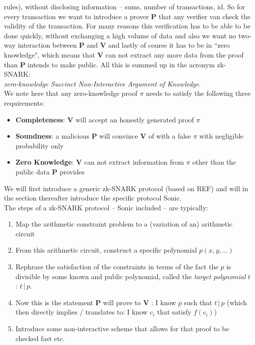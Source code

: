 \documentclass[11pt,oneside]{article}
\newcommand{\bP}{\textbf{P} }
\newcommand{\bV}{\textbf{V} }
\theoremstyle{definition}
\theoremstyle{remark}
\numberwithin{equation}{section}
\begin{document}
rules), without disclosing information -- sums, number of transactions, id. So
for every transaction we want to introduce a prover \bP that any verifier van
check the validity of the transaction. For many reasons this verification has to
be able to be done quickly, without exchanging a high volume of data and also we
want no two-way interaction between \bP and \bV and lastly of course it has to
be  in ``zero knowledge", which means that \bV can not extract any more data
from the proof than \bP intends to make public. All this is summed up in the
acronym zk-SNARK: \\ \indent\emph{zero-knowledge Succinct Non-Interactive
Argument of Knowledge}.  \\ We note here that any zero-knowledge proof $\pi$
needs to satisfy the following three requirements:
\begin{itemize}
\item \textbf{Completeness}: \bV will accept an honestly generated proof $\pi$
\item \textbf{Soundness}: a malicious \bP will convince \bV of with a false
  $\pi$ with negligible probability only \item \textbf{Zero Knowledge}: \bV can
  not extract information from $\pi$ other than the public data \bP provides
\end{itemize}
We will first introduce a generic zk-SNARK protocol (based on REF) and will in
the section thereafter introduce the specific protocol Sonic.\\ \newline The
steps of a zk-SNARK protocol -- Sonic included -- are typically:

\begin{enumerate}
\item Map the arithmetic constraint problem to a (variation of an) arithmetic
  circuit
\item From this arithmetic circuit, construct a specific polynomial
  $p(x,y,\ldots)$
\item Rephrase the satisfaction of the constraints in terms of the fact the $p$
  is divisible by some known and public polynomial, called the \emph{target
  polynomial} $t$: $t\,|\,p$.
\item Now this is the statement \bP will prove to \bV: I know $p$ such that
  $t\,|\,p$ (which then directly implies / translates to: I know $c_i$ that
  satisfy $f(c_i)$)
\item Introduce some non-interactive scheme that allows for that proof to be
  checked fast etc.
\end{enumerate}
\end{document}
